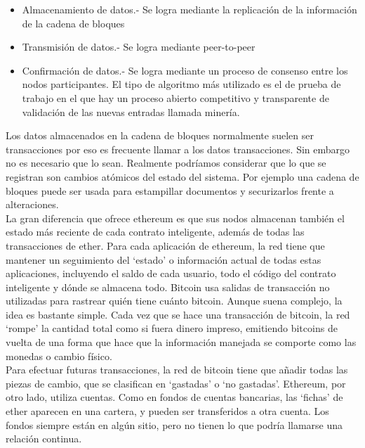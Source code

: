 \documentclass[11pt,a4paper]{article}
\begin{document}
\begin{itemize}
\item Almacenamiento de datos.- Se logra mediante la replicación de la información de la cadena de bloques
\item Transmisión de datos.- Se logra mediante peer-to-peer
\item Confirmación de datos.- Se logra mediante un proceso de consenso entre los nodos participantes. El tipo de algoritmo más utilizado es el de prueba de trabajo en el que hay un proceso abierto competitivo y transparente de validación de las nuevas entradas llamada minería.
\end{itemize}
Los datos almacenados en la cadena de bloques normalmente suelen ser transacciones por eso es frecuente llamar a los datos transacciones. Sin embargo no es necesario que lo sean. Realmente podríamos considerar que lo que se registran son cambios atómicos del estado del sistema. Por ejemplo una cadena de bloques puede ser usada para estampillar documentos y securizarlos frente a alteraciones.\\

La gran diferencia que ofrece ethereum es que sus nodos almacenan también el estado más reciente de cada contrato inteligente, además de todas las transacciones de ether. Para cada aplicación de ethereum, la red tiene que mantener un seguimiento del ‘estado’ o información actual de todas estas aplicaciones, incluyendo el saldo de cada usuario, todo el código del contrato inteligente y dónde se almacena todo. Bitcoin usa salidas de transacción no utilizadas para rastrear quién tiene cuánto bitcoin.
Aunque suena complejo, la idea es bastante simple. Cada vez que se hace una transacción de bitcoin, la red ‘rompe’ la cantidad total como si fuera dinero impreso, emitiendo bitcoins de vuelta de una forma que hace que la información manejada se comporte como las monedas o cambio físico.\\

Para efectuar futuras transacciones, la red de bitcoin tiene que añadir todas las piezas de cambio, que se clasifican en ‘gastadas’ o ‘no gastadas’. Ethereum, por otro lado, utiliza cuentas. Como en fondos de cuentas bancarias, las ‘fichas’ de ether aparecen en una cartera, y pueden ser transferidos a otra cuenta. Los fondos siempre están en algún sitio, pero no tienen lo que podría llamarse una relación continua.
\end{document}
